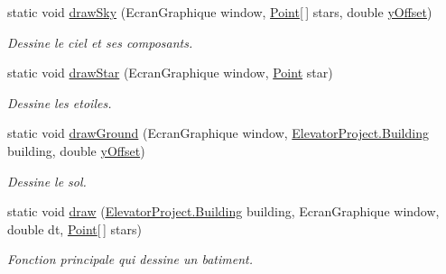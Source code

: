 \begin{DoxyCompactItemize}
static void \hyperlink{classGraphics_a5c2e759c0b8244e4970926ac1b588923}{draw\-Sky} (Ecran\-Graphique window, \hyperlink{classGraphics_1_1Point}{Point}\mbox{[}$\,$\mbox{]} stars, double \hyperlink{classGraphics_a005723dda272a11cb27933d59f4d90af}{y\-Offset})
\begin{DoxyCompactList}\small\item\em Dessine le ciel et ses composants. \end{DoxyCompactList}\item 
static void \hyperlink{classGraphics_a5678ce0ca6a9a8fedf3fe15993419280}{draw\-Star} (Ecran\-Graphique window, \hyperlink{classGraphics_1_1Point}{Point} star)
\begin{DoxyCompactList}\small\item\em Dessine les etoiles. \end{DoxyCompactList}\item 
static void \hyperlink{classGraphics_a9cc7630d73f9e4710e86e194c2acf75d}{draw\-Ground} (Ecran\-Graphique window, \hyperlink{classElevatorProject_1_1Building}{Elevator\-Project.\-Building} building, double \hyperlink{classGraphics_a005723dda272a11cb27933d59f4d90af}{y\-Offset})
\begin{DoxyCompactList}\small\item\em Dessine le sol. \end{DoxyCompactList}\item 
static void \hyperlink{classGraphics_a64678ac1443c02abcb5181c960f53733}{draw} (\hyperlink{classElevatorProject_1_1Building}{Elevator\-Project.\-Building} building, Ecran\-Graphique window, double dt, \hyperlink{classGraphics_1_1Point}{Point}\mbox{[}$\,$\mbox{]} stars)
\begin{DoxyCompactList}\small\item\em Fonction principale qui dessine un batiment. \end{DoxyCompactList}\end{DoxyCompactItemize}
